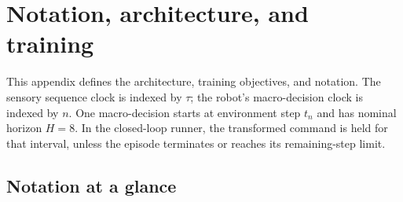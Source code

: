 \section{Notation, architecture, and training}
\label{app:training}
This appendix defines the architecture, training objectives, and notation. The sensory sequence
clock is indexed by $\tau$; the robot's macro-decision clock is indexed by $n$.
One macro-decision starts at environment step $t_n$ and has nominal horizon
$H=8$. In the closed-loop runner, the transformed command is held for that
interval, unless the episode terminates or reaches its remaining-step limit.

\subsection{Notation at a glance}

